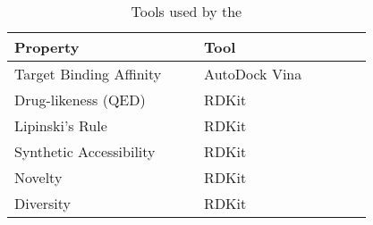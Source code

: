 \begin{table}[!t]
  \caption{Tools used by the \evaluator}
  \label{tab:tools}
  \centering
  \footnotesize
  \begin{threeparttable}
    \begin{tabular}{p{0.45\linewidth}p{0.4\linewidth}}
    \toprule
    \textbf{Property}     & \textbf{Tool} \\
    \midrule
    Target Binding Affinity & AutoDock Vina~\cite{trott_autodock_2010} \\
    Drug-likeness (QED)     & RDKit~\cite{rdkit}         \\
    Lipinski's Rule         & RDKit~\cite{rdkit}         \\
    Synthetic Accessibility & RDKit~\cite{rdkit}         \\
    Novelty                 & RDKit~\cite{rdkit}         \\
    Diversity               & RDKit~\cite{rdkit}         \\
    \bottomrule
    \end{tabular}
  \end{threeparttable}
\end{table}
